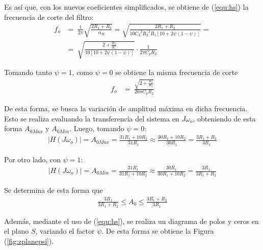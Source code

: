 \documentclass[a4paper]{article}
\begin{document}
Es así que, con los nuevos coeficientes simplificados, se obtiene de (\ref{equ:hs}) la frecuencia de corte del filtro:
\begin{equation}
\begin{split}
	f_o &=\ \frac{1}{2 \pi} \sqrt{\frac{2R_1 + R_2}{\alpha_H}} = \sqrt{\frac{2R_1 + R_2}{10 {C_{2}}^{2} {R_{2}}^{2} R_{1} \left[ 10 + 2 \psi \left(1 - \psi \right) \right]}} = \\
	&=\ \sqrt{\frac{2 + \frac{R_2}{R_1}}{10 \left[ 10 + 2 \psi \left(1 - \psi \right) \right]}} \cdot \frac{1}{2 \pi C_2 R_2}
\end{split}
\label{equ:fogeneral}
\end{equation}

Tomando tanto $\psi = 1$, como $\psi = 0$ se obtiene la misma frecuencia de corte
\begin{equation*}
\begin{split}
	f_o &=\ \frac{\sqrt{2 + \frac{R_2}{R_1}}}{20 \pi C_2 R_2}
\end{split}
\end{equation*}

De esta forma, se busca la variación de amplitud máxima en dicha frecuencia. Esto se realiza evaluando la transferencia del sistema en $J\omega_o$, obteniendo de esta forma $A_{0Max}$ y $A_{0Min}$. Luego, tomando $\psi = 0$:
\begin{equation*}
\begin{split}
|H\left(J\omega_o\right)| = A_{0Max} = \frac{31 R_{1} + 10 R_{2}}{31 R_{1}} \approx \frac{30 R_{1} + 10 R_{2}}{30 R_{1}} = \frac{3 R_{1} + R_{2}}{3 R_{1}}
\end{split}
\end{equation*}

Por otro lado, con $\psi = 1$:
\begin{equation*}
\begin{split}
|H\left(J\omega_o\right)| = A_{0Min} = \frac{31 R_{1}}{31 R_{1} + 10 R_{2}} \approx \frac{30 R_{1}}{30 R_{1} + 10 R_{2}} = \frac{3 R_{1}}{3 R_{1} + R_{2}}
\end{split}
\end{equation*}

Se determina de esta forma que
\begin{equation*}
\begin{split}
\frac{3 R_{1}}{3 R_{1} + R_{2}} \leq A_0 \leq \frac{3 R_{1} + R_{2}}{3 R_{1}}
\end{split}
\end{equation*}

Además, mediante el uso de (\ref{equ:hs}), se realiza un diagrama de polos y ceros en el plano $S$, variando el factor $\psi$. De esta forma se obtiene la Figura (\ref{fig:zplanepsi}).
\end{document}
